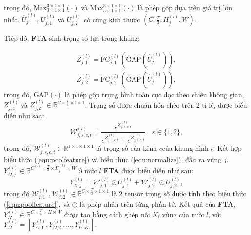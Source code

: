 \begin{enumerate}
          trong đó, $\text{Max}_{3 \times 1 \times 1}^{3\times 1 \times 1}\left(\cdot\right)$ và $\text{Max}_{5 \times 1 \times 1}^{3\times 1 \times 1}\left(\cdot\right)$ là phép gộp dựa trên giá trị lớn nhất. $\hat{U}_{j}^{(l)}$, $U_{j,1}^{(l)}$ và $U_{j,2}^{(l)}$ có cùng kích thước $(C,\frac{T}{3},H_j^{(l)},W)$.

          Tiếp đó, \textbf{FTA} sinh trọng số lựa trong khung:

          \begin{equation}
              \begin{gathered}
                  Z_{j,1}^{(l)}=\text{FC}_{j,1}^{(l)}\left(\text{GAP}\left(\hat{U}_j^{(l)}\right)\right),\\
                  Z_{j,2}^{(l)}=\text{FC}_{j,2}^{(l)}\left(\text{GAP}\left(\hat{U}_j^{(l)}\right)\right),
              \end{gathered}
              \label{equ:weight}
          \end{equation}
          trong đó, $\text{GAP}\left(\cdot\right)$  là phép gộp trụng bình toàn cục dọc theo chiều không gian, $Z_{j,1}^{(l)}$ và $ Z_{j,2}^{(l)} \in \mathbb{R}^{C  \times \frac{T}{3} \times 1 \times 1}$. Trọng số được chuẩn hóa chéo trên 2 tỉ lệ, được biểu diễn như sau:
          \begin{equation}
              \label{equ:normalize}
              \mathcal{W}_{j,s,c,t}^{(l)}=\frac{e^{Z_{j,s,c,t}^{(l)}}}{e^{Z_{j,1,c,t}^{(l)}}+e^{Z_{j,2,c,t}^{(l)}}}   \quad s\in \{1,2\},
          \end{equation}
          trong đó, $\mathcal{W}_{j,s,c,t}^{(l)} \in \mathbb{R}^{1 \times 1 \times 1 \times 1}$ là trọng số của kênh $c$của khung hình $t$.
          Kết hợp biểu thức (\ref{equ:poolfeature}) và biểu thức (\ref{equ:normalize}), đầu ra vùng $j$, $Y_{\Omega,j}^{(l)} \in \mathbb{R}^{C^{(l)} \times \frac{T}{3} \times H_j^{(l)} \times W}$ ở mức $l$ \textbf{FTA} được biểu diễn như sau:
          \begin{equation}
              Y_{\Omega,j}^{(l)}=\mathcal{W}_{j,1}^{(l)}\odot U_{j,1}^{(l)}+\mathcal{W}_{j,2}^{(l)}\odot U_{j,2}^{(l)},
          \end{equation}
          trong đó $\mathcal{W}_{j,1}^{(l)}, \mathcal{W}_{j,2}^{(l)} \in \mathbb{R}^{C \times \frac{T}{3} \times 1 \times 1}$ là 2 tensor trọng số được  tính theo biểu thức (\ref{equ:poolfeature}), và $\odot$ là phép nhân trên từng phần tử. Kết quả của \textbf{FTA}, $Y^{(l)}_{\Omega}\in \mathbb{R}^{C \times \frac{T}{3} \times H \times W}$ được tạo bằng cách ghép nối $K_l$ vùng của mức $l$, với $Y^{(l)}_{\Omega}=\left[Y_{\Omega,1}^{(l)},Y_{\Omega,2}^{(l)},\ldots,Y_{\Omega,K_l}^{(l)}\right]$.




\end{enumerate}
